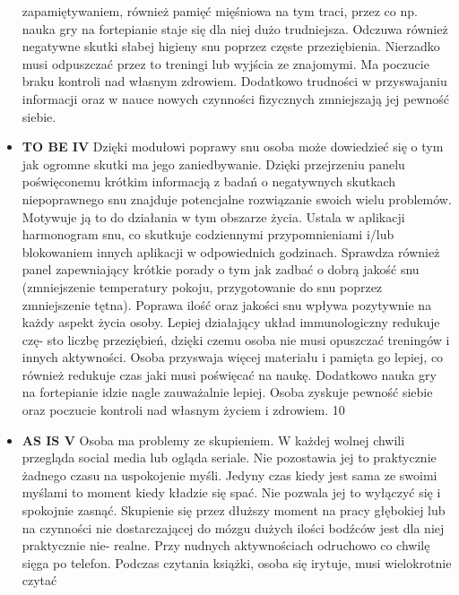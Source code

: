 \begin{itemize}
          zapamiętywaniem, również pamięć mięśniowa na tym traci, przez co np.
          nauka gry na fortepianie staje się dla niej dużo trudniejsza. Odczuwa
          również negatywne skutki słabej higieny snu poprzez częste
          przeziębienia. Nierzadko musi odpuszczać przez to treningi lub wyjścia
          ze znajomymi. Ma poczucie braku kontroli nad własnym zdrowiem.
          Dodatkowo trudności w przyswajaniu informacji oraz w nauce nowych
          czynności fizycznych zmniejszają jej pewność siebie.
    \item \textbf{TO BE IV} Dzięki modułowi poprawy snu osoba może dowiedzieć
          się o tym jak ogromne skutki ma jego zaniedbywanie. Dzięki przejrzeniu
          panelu poświęconemu krótkim informacją z badań o negatywnych skutkach
          niepoprawnego snu znajduje potencjalne rozwiązanie swoich wielu
          problemów. Motywuje ją to do działania w tym obszarze życia. Ustala w
          aplikacji harmonogram snu, co skutkuje codziennymi przypomnieniami
          i/lub blokowaniem innych aplikacji w odpowiednich godzinach. Sprawdza
          również panel zapewniający krótkie porady o tym jak zadbać o dobrą
          jakość snu (zmniejszenie temperatury pokoju, przygotowanie do snu
          poprzez zmniejszenie tętna). Poprawa ilość oraz jakości snu wpływa
          pozytywnie na każdy aspekt życia osoby. Lepiej działający układ
          immunologiczny redukuje czę- sto liczbę przeziębień, dzięki czemu
          osoba nie musi opuszczać treningów i innych aktywności. Osoba
          przyswaja więcej materiału i pamięta go lepiej, co również redukuje
          czas jaki musi poświęcać na naukę. Dodatkowo nauka gry na fortepianie
          idzie nagle zauważalnie lepiej. Osoba zyskuje pewność siebie oraz
          poczucie kontroli nad własnym życiem i zdrowiem. 10
    \item \textbf{AS IS V} Osoba ma problemy ze skupieniem. W każdej wolnej
          chwili przegląda social media lub ogląda seriale. Nie pozostawia jej
          to praktycznie żadnego czasu na uspokojenie myśli. Jedyny czas kiedy
          jest sama ze swoimi myślami to moment kiedy kładzie się spać. Nie
          pozwala jej to wyłączyć się i spokojnie zasnąć. Skupienie się przez
          dłuższy moment na pracy głębokiej lub na czynności nie dostarczającej
          do mózgu dużych ilości bodźców jest dla niej praktycznie nie- realne.
          Przy nudnych aktywnościach odruchowo co chwilę sięga po telefon.
          Podczas czytania książki, osoba się irytuje, musi wielokrotnie czytać

\end{itemize}
